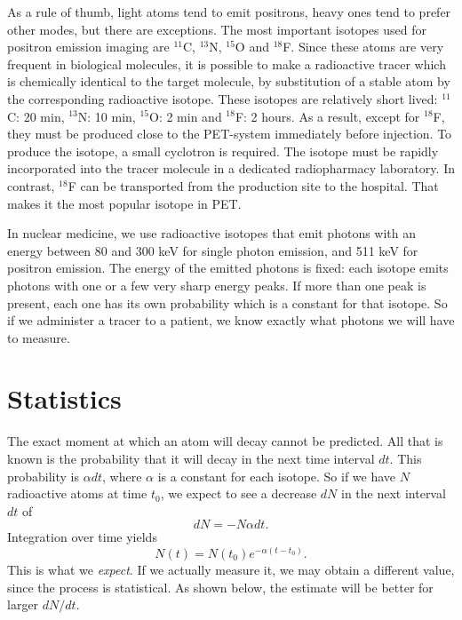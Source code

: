 \documentclass[11pt,oneside]{book}
\begin{document}
As a rule of thumb, light atoms tend to emit positrons, heavy ones
tend to prefer other modes, but there are exceptions. The most
important isotopes used for positron emission imaging are $^{11}$C,
$^{13}$N, $^{15}$O and $^{18}$F. Since these atoms are very frequent
in biological molecules, it is possible to make a radioactive tracer
which is chemically identical to the target molecule, by substitution
of a stable atom by the corresponding radioactive isotope. These
isotopes are relatively short lived: $^{11}$C: 20 min, $^{13}$N: 10
min, $^{15}$O: 2 min and $^{18}$F: 2 hours. As a result, except for
$^{18}$F, they must be produced close to the PET-system immediately
before injection. To produce the isotope, a small cyclotron is
required. The isotope must be rapidly incorporated into the tracer
molecule in a dedicated radiopharmacy laboratory. In contrast,
$^{18}$F can be transported from the production site to the
hospital. That makes it the most popular isotope in PET.

In nuclear medicine, we use radioactive isotopes that emit photons with an
energy between 80 and 300 keV for single photon emission, and 511 keV for
positron emission. The energy of the emitted photons is fixed: each isotope
emits photons with one or a few very sharp energy peaks. If more than one peak
is present, each one has its own probability which is a constant for that
isotope. So if we administer a tracer to a patient, we know exactly what
photons we will have to measure.


\section{Statistics} \label{sec:statistics}
The exact moment at which an atom will decay cannot be predicted. All that is
known is the probability that it will decay in the next time interval $dt$.
This probability is $\alpha dt$, where $\alpha$ is a constant for each
isotope.  So if we have $N$ radioactive atoms at time $t_0$, we expect to
see a decrease $dN$ in the next interval $dt$ of
\begin{equation}
  dN = - N \alpha dt. \label{eq:dN}
\end{equation}
Integration over time yields
\begin{equation}
  N(t) = N(t_0) e^{- \alpha (t - t_0)}. \label{jn:decay}
\end{equation}
This is what we {\em expect}. If we actually measure it, we may obtain a
different value, since the process is statistical. As shown below, the
estimate will be better for larger $dN/dt$.
\end{document}
